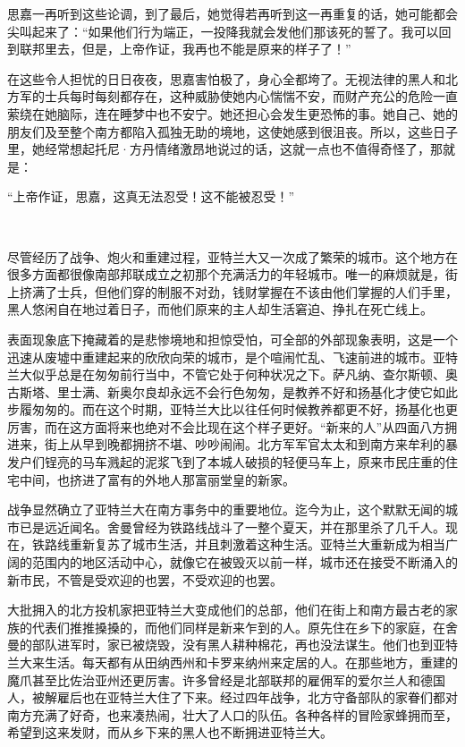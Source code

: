 \par 思嘉一再听到这些论调，到了最后，她觉得若再听到这一再重复的话，她可能都会尖叫起来了：“如果他们行为端正，一投降我就会发他们那该死的誓了。我可以回到联邦里去，但是，上帝作证，我再也不能是原来的样子了！”
\par 在这些令人担忧的日日夜夜，思嘉害怕极了，身心全都垮了。无视法律的黑人和北方军的士兵每时每刻都存在，这种威胁使她内心惴惴不安，而财产充公的危险一直萦绕在她脑际，连在睡梦中也不安宁。她还担心会发生更恐怖的事。她自己、她的朋友们及至整个南方都陷入孤独无助的境地，这使她感到很沮丧。所以，这些日子里，她经常想起托尼·方丹情绪激昂地说过的话，这就一点也不值得奇怪了，那就是：
\par “上帝作证，思嘉，这真无法忍受！这不能被忍受！”
\par  
\par 尽管经历了战争、炮火和重建过程，亚特兰大又一次成了繁荣的城市。这个地方在很多方面都很像南部邦联成立之初那个充满活力的年轻城市。唯一的麻烦就是，街上挤满了士兵，但他们穿的制服不对劲，钱财掌握在不该由他们掌握的人们手里，黑人悠闲自在地过着日子，而他们原来的主人却生活窘迫、挣扎在死亡线上。
\par 表面现象底下掩藏着的是悲惨境地和担惊受怕，可全部的外部现象表明，这是一个迅速从废墟中重建起来的欣欣向荣的城市，是个喧闹忙乱、飞速前进的城市。亚特兰大似乎总是在匆匆前行当中，不管它处于何种状况之下。萨凡纳、查尔斯顿、奥古斯塔、里士满、新奥尔良却永远不会行色匆匆，是教养不好和扬基化才使它如此步履匆匆的。而在这个时期，亚特兰大比以往任何时候教养都更不好，扬基化也更厉害，而在这方面将来也绝对不会比现在这个样子更好。“新来的人”从四面八方拥进来，街上从早到晚都拥挤不堪、吵吵闹闹。北方军军官太太和到南方来牟利的暴发户们锃亮的马车溅起的泥浆飞到了本城人破损的轻便马车上，原来市民庄重的住宅中间，也挤进了富有的外地人那富丽堂皇的新家。
\par 战争显然确立了亚特兰大在南方事务中的重要地位。迄今为止，这个默默无闻的城市已是远近闻名。舍曼曾经为铁路线战斗了一整个夏天，并在那里杀了几千人。现在，铁路线重新复苏了城市生活，并且刺激着这种生活。亚特兰大重新成为相当广阔的范围内的地区活动中心，就像它在被毁灭以前一样，城市还在接受不断涌入的新市民，不管是受欢迎的也罢，不受欢迎的也罢。
\par 大批拥入的北方投机家把亚特兰大变成他们的总部，他们在街上和南方最古老的家族的代表们推推搡搡的，而他们同样是新来乍到的人。原先住在乡下的家庭，在舍曼的部队进军时，家已被烧毁，没有黑人耕种棉花，再也没法谋生。他们也到亚特兰大来生活。每天都有从田纳西州和卡罗来纳州来定居的人。在那些地方，重建的魔爪甚至比佐治亚州还更厉害。许多曾经是北部联邦的雇佣军的爱尔兰人和德国人，被解雇后也在亚特兰大住了下来。经过四年战争，北方守备部队的家眷们都对南方充满了好奇，也来凑热闹，壮大了人口的队伍。各种各样的冒险家蜂拥而至，希望到这来发财，而从乡下来的黑人也不断拥进亚特兰大。
